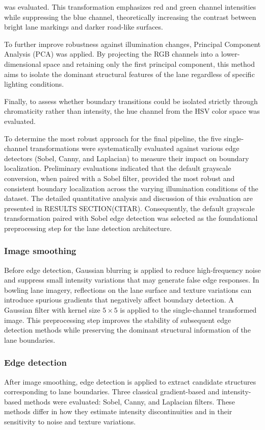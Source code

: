 was evaluated. This transformation emphasizes red and green channel intensities while suppressing the blue channel, theoretically increasing the contrast between bright lane markings and darker road-like surfaces.

To further improve robustness against illumination changes, Principal Component Analysis (PCA) was applied. By projecting the RGB channels into a lower-dimensional space and retaining only the first principal component, this method aims to isolate the dominant structural features of the lane regardless of specific lighting conditions.

Finally, to assess whether boundary transitions could be isolated strictly through chromaticity rather than intensity, the hue channel from the HSV color space was evaluated.

To determine the most robust approach for the final pipeline, the five single-channel transformations were systematically evaluated against various edge detectors (Sobel, Canny, and Laplacian) to measure their impact on boundary localization. Preliminary evaluations indicated that the default grayscale conversion, when paired with a Sobel filter, provided the most robust and consistent boundary localization across the varying illumination conditions of the dataset. The detailed quantitative analysis and discussion of this evaluation are presented in RESULTS SECTION(CITAR). Consequently, the default grayscale transformation paired with Sobel edge detection was selected as the foundational preprocessing step for the lane detection architecture.


\subsubsection{Image smoothing}
Before edge detection, Gaussian blurring is applied to reduce high-frequency noise and suppress small intensity variations that may generate false edge responses. In bowling lane imagery, reflections on the lane surface and texture variations can introduce spurious gradients that negatively affect boundary detection.
A Gaussian filter with kernel size $5\times 5$ is applied to the single-channel transformed image. This preprocessing step improves the stability of subsequent edge detection methods while preserving the dominant structural information of the lane boundaries.



\subsubsection{Edge detection}
After image smoothing, edge detection is applied to extract candidate structures corresponding to lane boundaries. Three classical gradient-based and intensity-based methods were evaluated: Sobel, Canny, and Laplacian filters. These methods differ in how they estimate intensity discontinuities and in their sensitivity to noise and texture variations.

